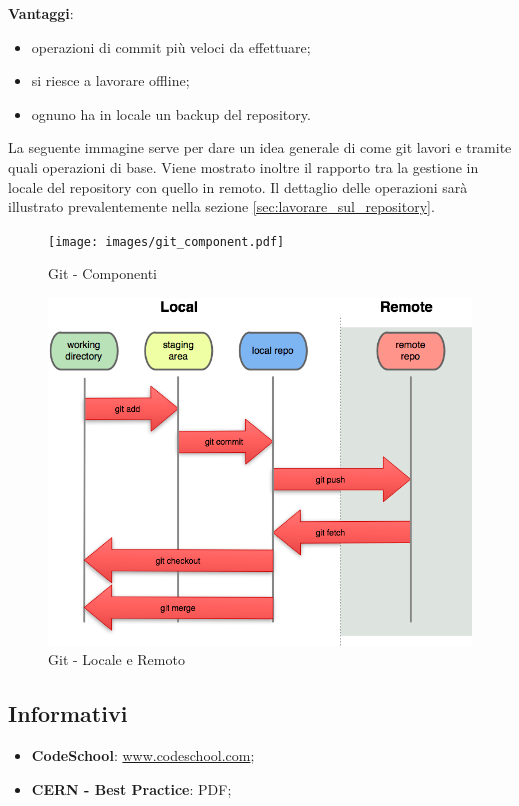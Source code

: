 \noindent
\textbf{Vantaggi}:
	\begin{itemize}
		\item operazioni di commit più veloci da effettuare;
		\item si riesce a lavorare offline;
		\item ognuno ha in locale un backup del repository.
	\end{itemize}
	\noindent
	\newline
La seguente immagine serve per dare un idea generale di come git lavori e tramite quali operazioni di base. Viene mostrato inoltre il rapporto tra la gestione in locale del repository con quello in remoto. Il dettaglio delle operazioni sarà illustrato prevalentemente nella sezione \ref{sec:lavorare_sul_repository}.
	\begin{figure}[htbp]
		\centering
		\texttt{[image: images/git\_component.pdf]}
		\caption{Git - Componenti}
		\label{fig:git_componenti}
	\end{figure}
	\begin{figure}[htbp]
		\centering
		\includegraphics[scale=1.1]{images/git_local_remote.png}
		\caption{Git - Locale e Remoto}
		\label{fig:git_locale_e_remoto}
	\end{figure}


	\subsection{Informativi} %
	\label{sub:informativi}
		\begin{itemize}
			\item \textbf{CodeSchool}: \url{www.codeschool.com};
			\item \textbf{CERN - Best Practice}: PDF;
		\end{itemize}

